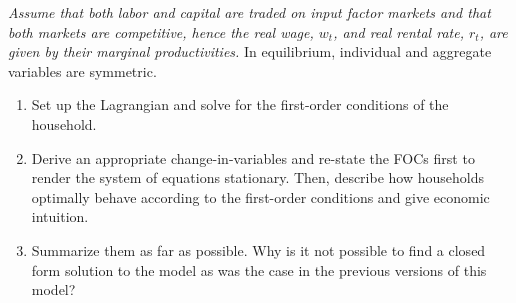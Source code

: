\documentclass[a4paper, 12pt]{article}
\begin{document}
\emph{Assume that both labor and capital are traded on input factor markets and that both markets are competitive, hence the real wage, $w_t$, and real rental rate, $r_t$, are given by their marginal productivities.} In equilibrium, individual and aggregate variables are symmetric.%
\bigskip%
\begin{Exercise}[title={An Economy with Money and Capital},label=ex_1]%
	\begin{enumerate}%
		\item[a) ] Set up the Lagrangian and solve for the first-order conditions of the household.%
		\item[b) ] Derive an appropriate change-in-variables and re-state the FOCs first to render the system of equations stationary. Then, describe how households optimally behave according to the first-order conditions and give economic intuition.%
		\item[c) ] Summarize them as far as possible. Why is it not possible to find a closed form solution to the model as was the case in the previous versions of this model?%
	\end{enumerate}%
\end{Exercise}%
\bigskip%
\end{document}
